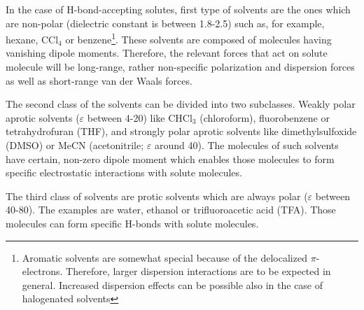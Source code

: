 \documentclass[a4paper,titlepage,twoside,fleqn,12pt]{book}
\begin{document}
\begin{refsection}
In the case of H\hyp{}bond\hyp{}accepting solutes, first type of solvents are the ones
which are non\hyp{}polar (dielectric constant is between 1.8-2.5) such as, for example,
hexane, CCl$_4$ or benzene\footnote{Aromatic solvents are somewhat special because 
of the delocalized $\pi$-electrons. Therefore, larger dispersion interactions are to be expected in general.
Increased dispersion effects can be possible also in the case of halogenated solvents}. 
These solvents are composed
of molecules having vanishing dipole moments. Therefore, the relevant forces that act on
solute molecule will be long\hyp{}range, rather non-specific polarization and dispersion
forces as well as short\hyp{}range van der Waals forces. 

The second class of the solvents can be divided into two subclasses. 
Weakly polar aprotic solvents ($\varepsilon$ between 4-20) 
like CHCl$_3$ (chloroform), fluorobenzene or tetrahydrofuran (THF), 
and strongly polar aprotic solvents like dimethylsulfoxide (DMSO) 
or MeCN (acetonitrile; $\varepsilon$ around 40).
The molecules of such solvents have certain, non-zero dipole moment 
which enables those molecules to form specific electrostatic interactions with 
solute molecules.

The third class of solvents are protic solvents which are always polar 
($\varepsilon$ between 40-80). The examples are water, ethanol or trifluoroacetic acid (TFA).
Those molecules can form specific H\hyp{}bonds with solute molecules. 


\end{refsection}
\end{document}
